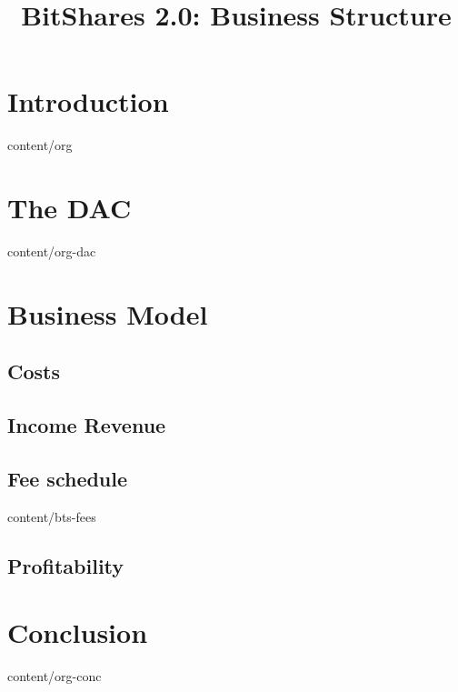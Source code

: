 \documentclass[conference,final,10pt,a4paper]{IEEEtran}
\title{BitShares 2.0: Business Structure}
\author{}
\begin{document}
\sloppy
\maketitle

\begin{abstract}
\end{abstract}
\section    { Introduction   }  { content/org      } 
\section    { The DAC        }  { content/org-dac  } 
\section    { Business Model } 
\subsection { Costs          } 
\subsection { Income Revenue } 
\subsection { Fee schedule   }  { content/bts-fees } 
\subsection { Profitability  } 
\section    { Conclusion     }  { content/org-conc } 


\end{document}
